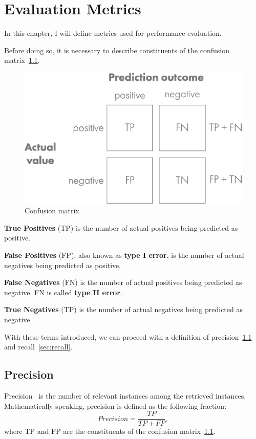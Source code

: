\chapter{Evaluation Metrics}\label{ch:evaluation-metrics}
In this chapter, I will define metrics used for performance evaluation.

Before doing so, it is necessary to describe constituents of the confusion matrix~\ref{fig:confusionmat}.

\begin{figure}[H]
    \centering
    \includegraphics[width=0.9\columnwidth]{images/implementation/confusion_matrix.eps}
    \caption{Confusion matrix~\cite{ConfMat}}
    \label{fig:confusionmat}
\end{figure}

\textbf{True Positives} (TP) is the number of actual positives being predicted as positive.

\textbf{False Positives} (FP), also known as \textbf{type I error}, is the number of actual negatives being predicted
as positive.

\textbf{False Negatives} (FN) is the number of actual positives being predicted as negative.
FN is called \textbf{type II error}.

\textbf{True Negatives} (TP) is the number of actual negatives being predicted as negative.

With these terms introduced, we can proceed with a definition of precision~\ref{sec:precision} and
recall~\ref{sec:recall}.

\section{Precision}\label{sec:precision}
Precision~\cite{PreRec} is the number of relevant instances among the retrieved instances.
Mathematically speaking, precision is defined as the following fraction:
\begin{equation}
    Precision = \frac{TP}{TP + FP},
\end{equation}
where TP and FP are the constituents of the confusion matrix~\ref{fig:confusionmat}.

